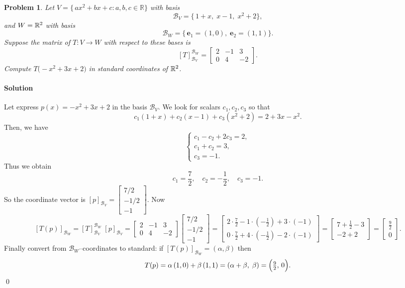 \documentclass[11pt,openany]{article}
\newtheorem{problem}{Problem}
\newenvironment{solution}{\paragraph{\color{magenta}Solution}}{}
\begin{document}
\newpage
\begin{problem}
Let $V = \{\,ax^2 + bx + c : a,b,c\in\mathbb{R}\}$ with basis 
\[
\mathcal{B}_V = \{\,1 + x,\; x - 1,\; x^2 + 2\},
\]
and $W = \Bbb R^2$ with basis 
\[
\mathcal{B}_W = \{\,\mathbf{e}_1 = (1,0),\;\mathbf{e}_2 = (1,1)\}.
\]
Suppose the matrix of $T:V\to W$ with respect to these bases is
\[
[T]_{\mathcal{B}_V}^{\mathcal{B}_W}
=
\begin{bmatrix}
	2 & -1 & 3\\
	0 & 4 & -2
\end{bmatrix}.
\]
Compute $T\!\bigl(- x^2+3x+2\bigr)$ in standard coordinates of $\Bbb R^2$.
\end{problem}
\begin{solution}\color{white}
	Let express $p(x)=-x^2+3x+2$ in the basis $\mathcal{B}_V$.  We look for scalars $c_1,c_2,c_3$ so that \[
	c_1(1+x) + c_2(x-1) + c_3(x^2+2) = 2 + 3x -x^2.
	\]
	Then, we have
	\[
	\begin{cases}
		c_1 - c_2 + 2c_3 = 2,\\
		c_1 + c_2 = 3,\\
		c_3 = -1.
	\end{cases}
	\] Thus we obtain \[
	c_1=\frac{7}{2},\quad c_2=-\frac{1}{2},\quad c_3=-1.
	\] So the coordinate vector is $[p]_{\mathcal{B}_V} =\begin{bmatrix}
		7/2\\ -1/2\\ -1
	\end{bmatrix}$.  Now
	\[
	[T(p)]_{\mathcal{B}_W}
	= [T]_{\mathcal{B}_V}^{\mathcal{B}_W}\;
	[p]_{\mathcal{B}_V}
	= 
	\begin{bmatrix}2&-1&3\\0&4&-2\end{bmatrix}
	\begin{bmatrix}7/2\\-1/2\\-1\end{bmatrix}
	= \begin{bmatrix}
		2\cdot\frac72 -1\cdot(-\tfrac12) +3\cdot(-1)\\
		0\cdot\frac72 +4\cdot(-\tfrac12) -2\cdot(-1)
	\end{bmatrix}
	= \begin{bmatrix}7 + \tfrac12 -3 \\ -2 +2\end{bmatrix}
	= \begin{bmatrix}\tfrac{9}{2}\\0\end{bmatrix}.
	\]
	Finally convert from $\mathcal{B}_W$–coordinates to standard: if $[T(p)]_{\mathcal{B}_W}=(\alpha,\beta)$ then
	\[
	T(p) = \alpha\,(1,0) + \beta\,(1,1)
	= (\alpha+\beta,\;\beta)
	= \Bigl(\tfrac92,\,0\Bigr).
	\]\color{black}\vfill\hfill\qed
\end{solution}
\end{document}
